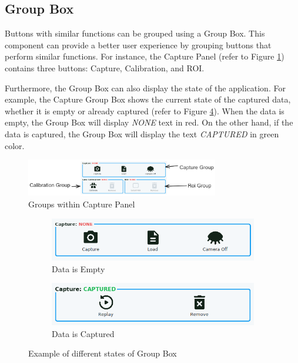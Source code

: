 \subsection{Group Box}

Buttons with similar functions can be grouped using a Group Box. This component can provide a better user experience by grouping buttons that perform similar functions. For instance, the Capture Panel (refer to Figure \ref{fig:group_example}) contains three buttons: Capture, Calibration, and ROI.

Furthermore, the Group Box can also display the state of the application. For example, the Capture Group Box shows the current state of the captured data, whether it is empty or already captured (refer to Figure \ref{fig:group_state}). When the data is empty, the Group Box will display \textit{NONE} text in red. On the other hand, if the data is captured, the Group Box will display the text \textit{CAPTURED} in green color.

\begin{figure}[!ht]
    \centering
    \includegraphics[width=0.75\textwidth]{texs/Part2/chapter4/image/groupexample.png}
    \caption{Groups within Capture Panel}
    \label{fig:group_example}
\end{figure}

\begin{figure}[ht!]
    \centering
    \begin{subfigure}[c]{0.8\textwidth}
        \begin{minipage}{\textwidth}
            \centering
            \includegraphics[height=2 cm]{texs/Part2/chapter4/image/ok10.png}
        \end{minipage}
        \caption{Data is Empty}
        \label{fig:group_empty}
    \end{subfigure}
    \begin{subfigure}[c]{0.8\textwidth}
        \begin{minipage}{\textwidth}
            \centering
            \includegraphics[height=2 cm]{texs/Part2/chapter4/image/ok11.png}
        \end{minipage}
        \caption{Data is Captured}
        \label{fig:group_captured}
    \end{subfigure}
    \caption{Example of different states of Group Box}
    \label{fig:group_state}
\end{figure}

